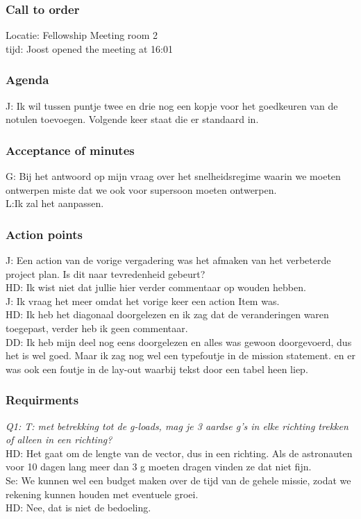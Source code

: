 \subsubsection{Call to order}
Locatie: Fellowship Meeting room 2\\
tijd: Joost opened the meeting at 16:01\\


\subsubsection{Agenda}
J: Ik wil tussen puntje twee en drie nog een kopje voor het goedkeuren van de notulen toevoegen. Volgende keer staat die er standaard in.\\

\subsubsection{Acceptance of minutes}
G: Bij het antwoord op mijn vraag over het snelheidsregime waarin we moeten ontwerpen miste dat we ook voor supersoon moeten ontwerpen.\\
L:Ik zal het aanpassen.\\

\subsubsection{Action points}
J: Een action van de vorige vergadering was het afmaken van het verbeterde project plan. Is dit naar tevredenheid gebeurt?\\
HD: Ik wist niet dat jullie hier verder commentaar op wouden hebben.\\
J: Ik vraag het meer omdat het vorige keer een action Item was.\\
HD: Ik heb het diagonaal doorgelezen en ik zag dat de veranderingen waren toegepast, verder heb ik geen commentaar.\\
DD: Ik heb mijn deel nog eens doorgelezen en alles was gewoon doorgevoerd, dus het is wel goed. Maar ik zag nog wel een typefoutje in de mission statement. en er was ook een foutje in de lay-out waarbij tekst door een tabel heen liep.\\

\subsubsection{Requirments}
\textit{Q1: T: met betrekking tot de g-loads, mag je 3 aardse g's in elke richting trekken of alleen in een richting?}\\
HD: Het gaat om de lengte van de vector, dus in een richting. Als de astronauten voor 10 dagen lang meer dan 3 g moeten dragen vinden ze dat niet fijn.\\
Se: We kunnen wel een budget maken over de tijd van de gehele missie, zodat we rekening kunnen houden met eventuele groei.\\
HD: Nee, dat is niet de bedoeling.

